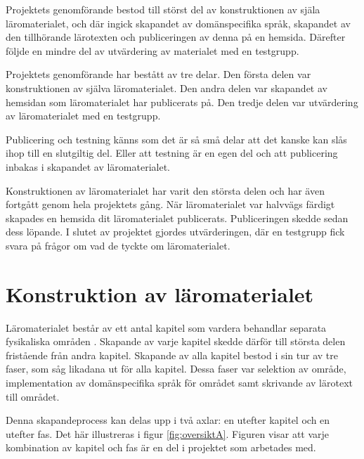 \begin{binge}

Projektets genomförande bestod till störst del av konstruktionen av själa
läromaterialet, och där ingick skapandet av domänspecifika språk, skapandet av
den tillhörande lärotexten och publiceringen av denna på en hemsida. Därefter
följde en mindre del av utvärdering av materialet med en testgrupp.

Projektets genomförande har bestått av tre delar. Den första delen var
konstruktionen av själva läromaterialet. Den andra delen var skapandet av
hemsidan som läromaterialet har publicerats på. Den tredje delen var
utvärdering av läromaterialet med en testgrupp.

\begin{center}
Publicering och testning känns som det är så små delar att det kanske kan slås
ihop till en slutgiltig del. Eller att testning är en egen del och att
publicering inbakas i skapandet av läromaterialet.  
\end{center}

Konstruktionen av läromaterialet har varit den största delen och har även
fortgått genom hela projektets gång. När läromaterialet var halvvägs färdigt
skapades en hemsida dit läromaterialet publicerats. Publiceringen skedde sedan
dess löpande. I slutet av projektet gjordes utvärderingen, där en testgrupp
fick svara på frågor om vad de tyckte om läromaterialet.

\section{Konstruktion av läromaterialet}

Läromaterialet består av ett antal kapitel som vardera behandlar separata
fysikaliska områden .
Skapande av varje kapitel skedde därför till största delen fristående från
andra kapitel. Skapande av alla kapitel bestod i sin tur av tre
faser, som såg likadana ut för alla kapitel. Dessa faser var selektion av
område, implementation av domänspecifika språk för området samt skrivande av
lärotext till området.

Denna skapandeprocess kan delas upp i två axlar: en utefter kapitel och en
utefter fas. Det här illustreras i figur \ref{fig:oversiktA}. Figuren visar att
varje kombination av kapitel och fas är en del i projektet som arbetades med.


\end{binge}
